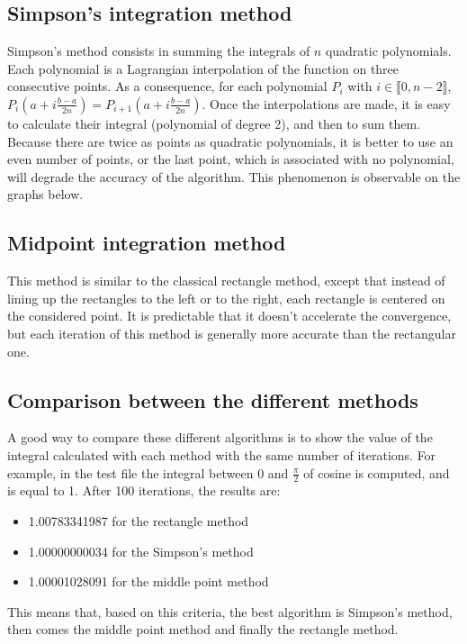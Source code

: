 \documentclass{article}
\begin{document}
\subsection{Simpson's integration method}
Simpson's method consists in summing the integrals of $n$ quadratic polynomials. Each polynomial is a Lagrangian interpolation of the function on three consecutive points.
As a consequence, for each polynomial $P_i$ with $i \in \llbracket 0, n - 2 \rrbracket$, $P_i(a + i \frac{b-a}{2n}) = P_{i+1}(a + i \frac{b-a}{2n})$. Once the interpolations are made, it is easy to calculate their integral (polynomial of degree 2), and then to sum them. Because there are twice as points as quadratic polynomials, it is better to use an even number of points, or the last point, which is associated with no polynomial, will degrade the accuracy of the algorithm. This phenomenon is observable on the graphs below.

\subsection{Midpoint integration method}
This method is similar to the classical rectangle method, except that instead of lining up the rectangles to the left or to the right, each rectangle is centered on the considered point. It is predictable that it doesn't accelerate the convergence, but each iteration of this method is generally more accurate than the rectangular one.

\subsection{Comparison between the different methods}

A good way to compare these different algorithms is to show the value of the integral calculated with each method with the same number of iterations. For example, in the test file the integral between $0$ and $\frac{\pi}{2}$ of cosine is computed, and is equal to 1. After 100 iterations, the results are:
\begin{itemize}
\item 1.00783341987 for the rectangle method
\item 1.00000000034 for the Simpson's method
\item 1.00001028091 for the middle point method
\end{itemize}
This means that, based on this criteria, the best algorithm is Simpson's method, then comes the middle point method and finally the rectangle method.
\end{document}
